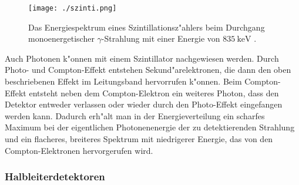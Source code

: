 \documentclass[12pt]{article}
\begin{document}
\begin{wrapfigure}{r}[2cm]{0.4\textwidth}
 	\texttt{[image: ./szinti.png]}
 	\caption[Energiespektrum Szintillator]{Das Energiespektrum eines Szintillationsz"ahlers beim Durchgang monoenergetischer $\gamma$-Strahlung mit einer Energie von $\SI{835}{\kilo\electronvolt}$ \cite{demtroeder}.}    
 	\label{fig:spektrum_szinti}
\end{wrapfigure}
\noindent
Auch Photonen k"onnen mit einem Szintillator nachgewiesen werden. Durch Photo- und Compton-Effekt entstehen Sekund"arelektronen, die dann den oben beschriebenen Effekt im Leitungsband hervorrufen k"onnen. Beim Compton-Effekt entsteht neben dem Compton-Elektron ein weiteres Photon, dass den Detektor entweder verlassen oder wieder durch den Photo-Effekt eingefangen werden kann. Dadurch erh"alt man in der Energieverteilung ein scharfes Maximum bei der eigentlichen Photonenenergie der zu detektierenden Strahlung und ein flacheres, breiteres Spektrum mit niedrigerer Energie, das von den Compton-Elektronen hervorgerufen wird. 

\subsubsection{Halbleiterdetektoren}
\end{document}
